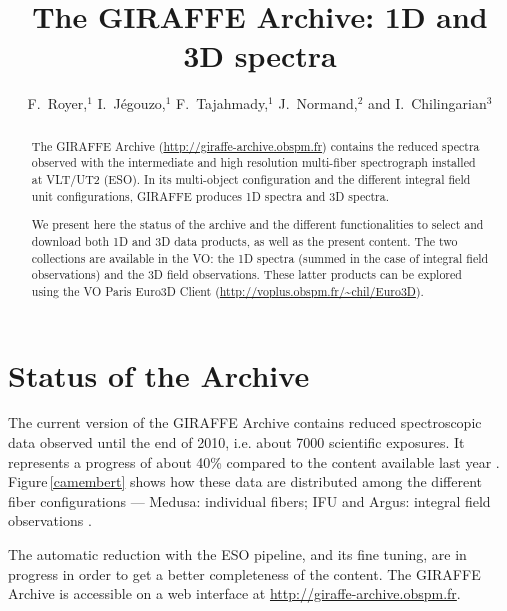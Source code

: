 
\resetcounters



\title{The GIRAFFE Archive: 1D and 3D spectra}
\author{F.~Royer,$^1$ I.~J\'egouzo,$^1$ F.~Tajahmady,$^1$ J.~Normand,$^2$ and I.~Chilingarian$^3$
}


\begin{abstract}
 The GIRAFFE Archive (\url{http://giraffe-archive.obspm.fr}) contains the reduced spectra observed with the intermediate and high resolution multi-fiber spectrograph installed at VLT/UT2 (ESO). In its multi-object configuration and the different integral field unit configurations, GIRAFFE produces 1D spectra and 3D spectra.

We present here the status of the archive and the different functionalities to select and download both 1D and 3D data products, as well as the present content. The two collections are available in the VO: the 1D spectra (summed in the case of integral field observations) and the 3D field observations. These latter products can be explored using the VO Paris Euro3D Client (\url{http://voplus.obspm.fr/~chil/Euro3D}). 
\end{abstract}

\section{Status of the Archive}

 The current version of the GIRAFFE Archive contains reduced spectroscopic data observed until the end of 2010, i.e. about 7000 scientific exposures. It represents a progress of about 40\% compared to the content available last year \citep{Ror_12}.
Figure\,\ref{camembert} shows how these data are distributed among the different fiber configurations --- Medusa: individual fibers; IFU and Argus: integral field observations \citep[details about the instrument can be found in][]{Pai_02}. 

 The automatic reduction with the ESO pipeline, and its fine tuning, are in progress in order to get a better completeness of the content. The GIRAFFE Archive is accessible on a web interface at \url{http://giraffe-archive.obspm.fr}.

